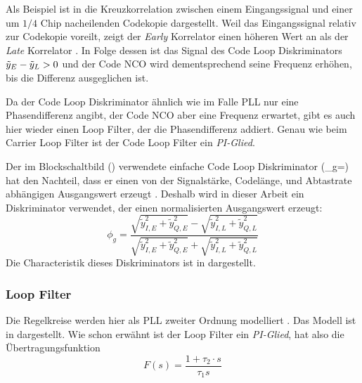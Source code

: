 Als Beispiel ist in  die Kreuzkorrelation zwischen einem Eingangssignal und einer um $1/4$ Chip nacheilenden Codekopie dargestellt. Weil das Eingangssignal relativ zur Codekopie voreilt, zeigt der \emph{Early} Korrelator \markerEarly einen höheren Wert an als der \emph{Late} Korrelator \markerLate. In Folge dessen ist das Signal des Code Loop Diskriminators  $\tilde{y}_E - \tilde{y}_L>0$ und der Code NCO wird dementsprechend seine Frequenz erhöhen, bis die Differenz ausgeglichen ist.



Da der Code Loop Diskriminator ähnlich wie im Falle PLL nur eine Phasendifferenz angibt, der Code NCO aber eine Frequenz erwartet, gibt es auch hier wieder einen Loop Filter, der die Phasendifferenz addiert. Genau wie beim Carrier Loop Filter ist der Code Loop Filter ein \emph{PI-Glied}.

Der im Blockschaltbild () verwendete einfache Code Loop Diskriminator (\phi_g=) hat den Nachteil, dass er einen von der Signalstärke, Codelänge, und Abtastrate abhängigen Ausgangswert erzeugt \cite{borre2007software}. Deshalb wird in dieser Arbeit ein Diskriminator verwendet, der einen normalisierten Ausgangswert erzeugt:
\begin{equation}
    \phi_g = \frac{\sqrt{\tilde{y}_{I,E}^2+\tilde{y}_{Q,E}^2}-\sqrt{\tilde{y}_{I,L}^2+\tilde{y}_{Q,L}^2}}{\sqrt{\tilde{y}_{I,E}^2+\tilde{y}_{Q,E}^2}+\sqrt{\tilde{y}_{I,L}^2+\tilde{y}_{Q,L}^2}}
\end{equation}
Die Characteristik dieses Diskriminators ist in  dargestellt.


\subsubsection{Loop Filter} \label{loopfilter}
Die Regelkreise werden hier als PLL zweiter Ordnung modelliert \cite{borre2007software}. Das Modell ist in  dargestellt. Wie schon erwähnt ist der Loop Filter ein \emph{PI-Glied}, hat also die Übertragungsfunktion \cite{gardner2005phaselock}
\begin{equation}
\label{Eq:analogloopfilter}
    F(s)=\frac{1 + \tau_2 \cdot s}{\tau_1 s}
\end{equation}

